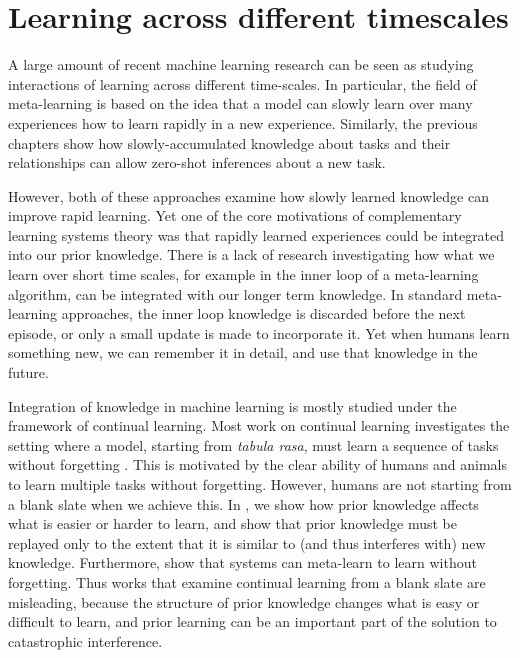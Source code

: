 \chapter{Learning across different timescales} \label{chapter:timescales}

A large amount of recent machine learning research can be seen as studying interactions of learning across different time-scales. In particular, the field of meta-learning is based on the idea that a model can slowly learn over many experiences how to learn rapidly in a new experience. Similarly, the previous chapters show how slowly-accumulated knowledge about tasks and their relationships can allow zero-shot inferences about a new task. \par 

However, both of these approaches examine how slowly learned knowledge can improve rapid learning. Yet one of the core motivations of complementary learning systems theory was that rapidly learned experiences could be integrated into our prior knowledge. There is a lack of research investigating how what we learn over short time scales, for example in the inner loop of a meta-learning algorithm, can be integrated with our longer term knowledge. In standard meta-learning approaches, the inner loop knowledge is discarded before the next episode, or only a small update is made to incorporate it. Yet when humans learn something new, we can remember it in detail, and use that knowledge in the future.\par 

Integration of knowledge in machine learning is mostly studied under the framework of continual learning. Most work on continual learning investigates the setting where a model, starting from \emph{tabula rasa}, must learn a sequence of tasks without forgetting \citep{Ven2018, Atkinson2018}. This is motivated by the clear ability of humans and animals to learn multiple tasks without forgetting. However, humans are not starting from a blank slate when we achieve this. In \citet{McClelland2020}, we show how prior knowledge affects what is easier or harder to learn, and show that prior knowledge must be replayed only to the extent that it is similar to (and thus interferes with) new knowledge. Furthermore, \citet{Velez2017} show that systems can meta-learn to learn without forgetting. Thus works that examine continual learning from a blank slate are misleading, because the structure of prior knowledge changes what is easy or difficult to learn, and prior learning can be an important part of the solution to catastrophic interference. \par 

